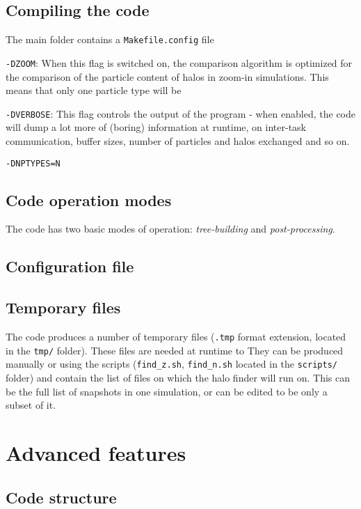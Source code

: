 \documentclass{article}
\begin{document}
\subsection{Compiling the code}

The main folder contains a \texttt{Makefile.config} file 

\noindent
\texttt{-DZOOM}: When this flag is switched on, the comparison algorithm is optimized for the comparison of the 
particle content of halos in zoom-in simulations. This means that only one particle type will be

\noindent
\texttt{-DVERBOSE}: This flag controls the output of the program - when enabled, the code will dump a lot more of 
(boring) information at runtime, on inter-task communication, buffer sizes, number of particles and halos exchanged and so on.

\noindent
\texttt{-DNPTYPES=N}

\subsection{Code operation modes}

The code has two basic modes of operation: \emph{tree-building} and \emph{post-processing}.

\subsection{Configuration file}

\subsection{Temporary files}

The code produces a number of temporary files (\texttt{.tmp} format extension, located in the \texttt{tmp/} folder).
These files are needed at runtime to 
They can be produced manually or using the scripts (\texttt{find\_z.sh}, \texttt{find\_n.sh} located in the \texttt{scripts/} folder)
and contain the list of files on which the halo finder will run on.
This can be the full list of snapshots in one simulation, or can be edited to be only a subset of it.

\section{Advanced features}
\subsection{Code structure}
\end{document}
